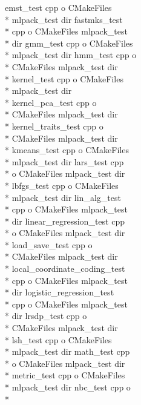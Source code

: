 \begin{DoxyCompactItemize}
emst\-\_\-test cpp o C\-Make\-Files \\*
mlpack\-\_\-test dir fastmks\-\_\-test \\*
cpp o C\-Make\-Files mlpack\-\_\-test \\*
dir gmm\-\_\-test cpp o C\-Make\-Files \\*
mlpack\-\_\-test dir hmm\-\_\-test cpp o \\*
C\-Make\-Files mlpack\-\_\-test dir \\*
kernel\-\_\-test cpp o C\-Make\-Files \\*
mlpack\-\_\-test dir \\*
kernel\-\_\-pca\-\_\-test cpp o \\*
C\-Make\-Files mlpack\-\_\-test dir \\*
kernel\-\_\-traits\-\_\-test cpp o \\*
C\-Make\-Files mlpack\-\_\-test dir \\*
kmeans\-\_\-test cpp o C\-Make\-Files \\*
mlpack\-\_\-test dir lars\-\_\-test cpp \\*
o C\-Make\-Files mlpack\-\_\-test dir \\*
lbfgs\-\_\-test cpp o C\-Make\-Files \\*
mlpack\-\_\-test dir lin\-\_\-alg\-\_\-test \\*
cpp o C\-Make\-Files mlpack\-\_\-test \\*
dir linear\-\_\-regression\-\_\-test cpp \\*
o C\-Make\-Files mlpack\-\_\-test dir \\*
load\-\_\-save\-\_\-test cpp o \\*
C\-Make\-Files mlpack\-\_\-test dir \\*
local\-\_\-coordinate\-\_\-coding\-\_\-test \\*
cpp o C\-Make\-Files mlpack\-\_\-test \\*
dir logistic\-\_\-regression\-\_\-test \\*
cpp o C\-Make\-Files mlpack\-\_\-test \\*
dir lrsdp\-\_\-test cpp o \\*
C\-Make\-Files mlpack\-\_\-test dir \\*
lsh\-\_\-test cpp o C\-Make\-Files \\*
mlpack\-\_\-test dir math\-\_\-test cpp \\*
o C\-Make\-Files mlpack\-\_\-test dir \\*
metric\-\_\-test cpp o C\-Make\-Files \\*
mlpack\-\_\-test dir nbc\-\_\-test cpp o \\*

\end{DoxyCompactItemize}
